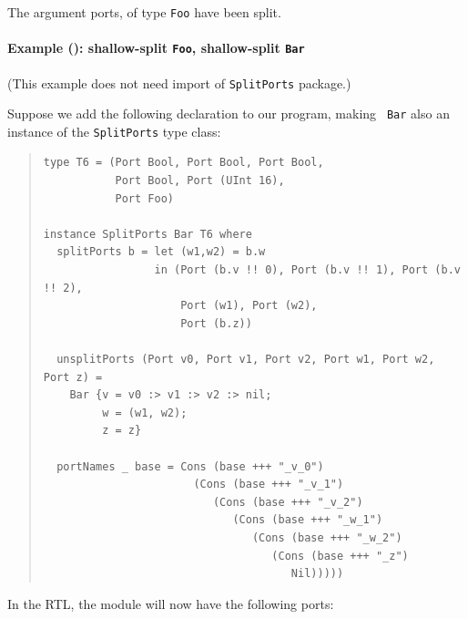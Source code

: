 The argument ports, of type {\tt Foo} have been split.


\paragraph{Example (\BH): shallow-split {\tt Foo}, shallow-split {\tt Bar}}

\label{sec:splitports_examples_BH_Foo_Shallow_Bar_Shallow}

\hspace*{1em}

{\footnotesize (This example does not need import of {\tt SplitPorts} package.)}

Suppose we add the following declaration to our program, making {\tt
  Bar} also an instance of the {\tt SplitPorts} type class:

\begin{quote}
\begin{verbatim}
type T6 = (Port Bool, Port Bool, Port Bool,
           Port Bool, Port (UInt 16),
           Port Foo)

instance SplitPorts Bar T6 where
  splitPorts b = let (w1,w2) = b.w
                 in (Port (b.v !! 0), Port (b.v !! 1), Port (b.v !! 2),
                     Port (w1), Port (w2),
                     Port (b.z))

  unsplitPorts (Port v0, Port v1, Port v2, Port w1, Port w2, Port z) =
    Bar {v = v0 :> v1 :> v2 :> nil;
         w = (w1, w2);
         z = z}

  portNames _ base = Cons (base +++ "_v_0")
                       (Cons (base +++ "_v_1")
                          (Cons (base +++ "_v_2")
                             (Cons (base +++ "_w_1")
                                (Cons (base +++ "_w_2")
                                   (Cons (base +++ "_z")
                                      Nil)))))
\end{verbatim}
\end{quote}

In the RTL, the module will now have the following ports:

